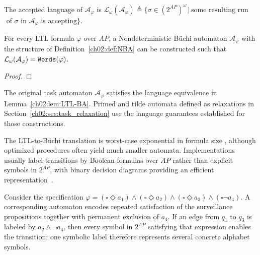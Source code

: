 \begin{definition}
\label{ch02:def:buchi_language}
The accepted language of $\mathcal{A}_{\varphi}$ is
$\mathcal{L}_{\omega}(\mathcal{A}_{\varphi})
\triangleq
\{
\sigma \in (2^{AP})^{\omega}
\,|\,
\text{some resulting run}$
$\text{ of $\sigma$ in $\mathcal{A}_{\varphi}$ is accepting}\}$.
\end{definition}


\begin{lemma}
\label{ch02:lem:LTL-BA}
\begin{revision}
For every LTL formula $\varphi$ over $AP$, a Nondeterministic B\"uchi
automaton $\mathcal{A}_{\varphi}$ with the structure of
Definition~\ref{ch02:def:NBA} can be constructed such that
$\mathcal{L}_{\omega}(\mathcal{A}_{\varphi})
=\textup{\texttt{Words}}(\varphi)$.
\end{revision}
\end{lemma}

\begin{proof}
\end{proof}

\begin{revision}
The original task automaton $\mathcal{A}_{\varphi}$ satisfies the language
equivalence in Lemma~\ref{ch02:lem:LTL-BA}. Primed and tilde automata
defined as relaxations in Section~\ref{ch02:sec:task_relaxation} use the language
guarantees established for those constructions.
\end{revision}

The LTL-to-B\"uchi translation is worst-case exponential in formula size
\citep{baier2008principles}, although optimized procedures often yield much
smaller automata. 
Implementations usually label transitions by Boolean formulas over $AP$ rather
than explicit symbols in $2^{AP}$, with binary decision diagrams providing an
efficient representation~\citep{akers1978binary}.


\begin{example}
\label{ch02:examp:NBA}
Consider the specification
$\varphi = (\square\Diamond a_1) \wedge (\square\Diamond a_2)
\wedge (\square\Diamond a_3) \wedge (\square \neg a_4)$.
A corresponding automaton encodes repeated satisfaction of the surveillance
propositions together with permanent exclusion of $a_4$. If an edge from
$q_1$ to $q_3$ is labeled by $a_2 \wedge \neg a_4$, then every symbol in
$2^{AP}$ satisfying that expression enables the transition; one symbolic label
therefore represents several concrete alphabet symbols.
\end{example}

